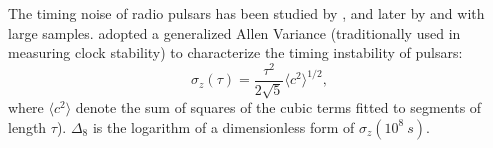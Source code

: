 The timing noise of radio pulsars has been studied by
\citet{ch80,cd85,antt94,dmhd95, mtem97}, and later by \citet{hlk10} and
\citet{sc10} with large samples. 
\citet{mtem97} adopted a generalized Allen Variance (traditionally used in
measuring clock stability) to characterize the timing instability of pulsars:
\begin{equation}
\label{eq:sigmaz}
\sigma_z(\tau) = \frac{\tau^2}{2\sqrt{5}}\langle c^2 \rangle^{1/2},
\end{equation}
where $\langle c^2\rangle$ denote the sum of squares of the cubic
terms fitted to segments of length $\tau$). 
$\Delta_8$ is the logarithm of a dimensionless form of $\sigma_z(10^8~s)$.
